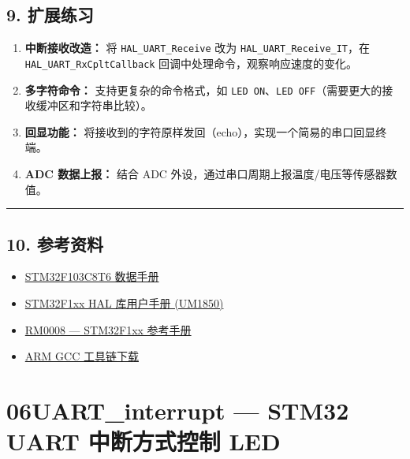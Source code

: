 \documentclass[
  chinese,
  UTF8,
  oneside,
  openany]{ctexbook}
\providecommand{\tightlist}{%
  \setlength{\itemsep}{0pt}\setlength{\parskip}{0pt}}
\begin{document}
\section{9. 扩展练习}\label{ux6269ux5c55ux7ec3ux4e60}

\begin{enumerate}
\def\labelenumi{\arabic{enumi}.}
\item
  \textbf{中断接收改造：} 将 \texttt{HAL\_UART\_Receive} 改为
  \texttt{HAL\_UART\_Receive\_IT}，在 \texttt{HAL\_UART\_RxCpltCallback}
  回调中处理命令，观察响应速度的变化。
\item
  \textbf{多字符命令：} 支持更复杂的命令格式，如
  \texttt{LED\ ON}、\texttt{LED\ OFF}（需要更大的接收缓冲区和字符串比较）。
\item
  \textbf{回显功能：}
  将接收到的字符原样发回（echo），实现一个简易的串口回显终端。
\item
  \textbf{ADC 数据上报：} 结合 ADC
  外设，通过串口周期上报温度/电压等传感器数值。
\end{enumerate}

\begin{center}\rule{0.5\linewidth}{0.5pt}\end{center}

\section{10. 参考资料}\label{ux53c2ux8003ux8d44ux6599}

\begin{itemize}
\tightlist
\item
  \href{https://www.st.com/resource/en/datasheet/stm32f103c8.pdf}{STM32F103C8T6
  数据手册}
\item
  \href{https://www.st.com/resource/en/user_manual/um1850-description-of-stm32f1-hal-and-lowlayer-drivers-stmicroelectronics.pdf}{STM32F1xx
  HAL 库用户手册 (UM1850)}
\item
  \href{https://www.st.com/resource/en/reference_manual/rm0008-stm32f101xx-stm32f102xx-stm32f103xx-stm32f105xx-and-stm32f107xx-advanced-armbased-32bit-mcus-stmicroelectronics.pdf}{RM0008
  --- STM32F1xx 参考手册}
\item
  \href{https://developer.arm.com/tools-and-software/open-source-software/developer-tools/gnu-toolchain/gnu-rm/downloads}{ARM
  GCC 工具链下载}
\end{itemize}

\chapter{06UART\_interrupt --- STM32 UART 中断方式控制
LED}\label{uart_interrupt-stm32-uart-ux4e2dux65adux65b9ux5f0fux63a7ux5236-led}
\end{document}
